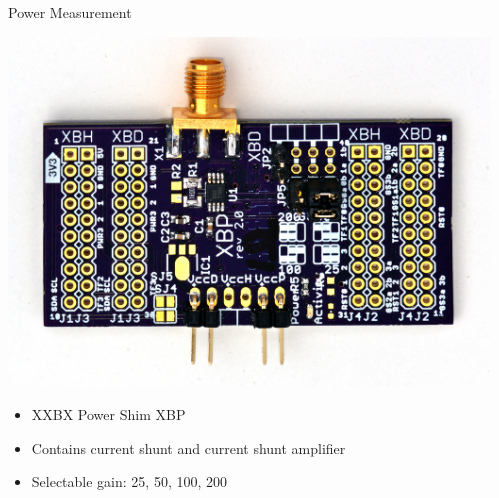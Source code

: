 \documentclass[xcolor=pdftex,dvipsnames,table,final]{beamer}
\begin{document}
\begin{frame}[fragile]{}
\begin{columns}[t]
\begin{column}{.31\linewidth}
\begin{block}{Power Measurement}
\begin{minipage}{0.45\linewidth}
         \vspace{-0.7ex}
		\includegraphics[scale=0.9]{../figures/xbp-no-xbh}
         \vspace{-1ex}
        \end{minipage}%
	\begin{minipage}{0.48\linewidth}
          \begin{itemize}
            \item XXBX Power Shim XBP
            \item Contains current shunt and current shunt amplifier
            \item Selectable gain: 25, 50, 100, 200
          \end{itemize}
	\end{minipage} 
       \end{block}
          
    \end{column}
   \begin{column}{.31\linewidth}
    


\end{column}
\end{columns}
\end{frame}
\end{document}
